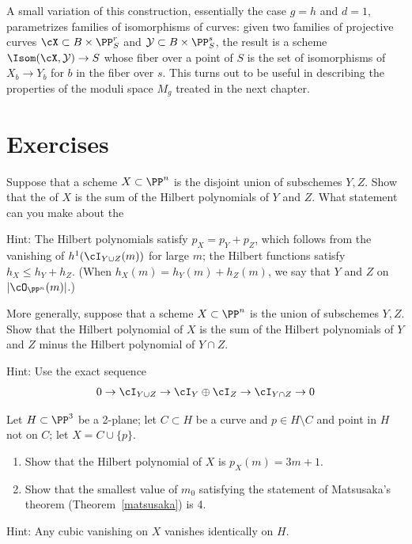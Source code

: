 A small variation of this construction, essentially the case $g=h$
and $d=1$, parametrizes families of
isomorphisms of curves: given two families of projective curves $\cX
\subset B \times \PP^r_{S}$ and $\mathcal{Y} \subset B\times \PP^s_{S}$,
%
%
the result is a scheme $\Isom(\cX, \mathcal{Y}) \to S$ whose
fiber over a point of $S$ is the set of isomorphisms of $X_{b}\to Y_{b}$
for $b$ in the fiber over $s$.
This turns out to be useful in describing the properties of the moduli
space $M_{g}$ treated in the
next chapter.

\section{Exercises}

\begin{exercise}
\label{deg of disjoint union}
Suppose that a scheme $X\subset \PP^n$ is the disjoint union of subschemes
$Y,Z$. Show that the
of
$X$ is the sum of the Hilbert polynomials of $Y$ and $Z$. What statement
%
%
can you make about the
%

Hint: The Hilbert polynomials satisfy $p_X = p_Y + p_Z$, which follows
from the vanishing of $h^1(\cI_{Y\cup Z} (m))$ for large $m$; the
Hilbert functions satisfy $h_X \leq h_Y + h_Z$. (When $h_X(m) = h_Y(m)
+ h_Z(m)$, we say that $Y$ and $Z$
%
on $|\cO_{\PP^n}(m)|$.)
\end{exercise}

\begin{exercise}
More generally, suppose that a scheme $X\subset \PP^n$ is the union of
subschemes $Y,Z$. Show that the Hilbert polynomial of
$X$ is the sum of the Hilbert polynomials of $Y$ and $Z$ minus the
Hilbert polynomial of $Y\cap Z$.

Hint: Use the exact sequence
$$
0 \to \cI_{Y\cup Z} \to \cI_{Y} \oplus \cI_{Z} \to \cI_{Y \cap Z} \to 0
$$
\end{exercise}

\begin{exercise}
Let $H \subset \PP^3$ be a 2-plane; let $C \subset H$ be a
%
%
curve and $p \in H \setminus C$ and point in $H$ not on $C$; let $X =
C \cup \{p\}$.
\begin{enumerate}
\item Show that the Hilbert polynomial of $X$ is $p_X(m) = 3m+1$.
\item Show that the smallest value of $m_0$ satisfying the statement of
Matsusaka's theorem (Theorem~\ref{matsusaka})
%
 is 4.
\end{enumerate}

Hint: Any cubic vanishing on $X$ vanishes identically on $H$.
\end{exercise}

